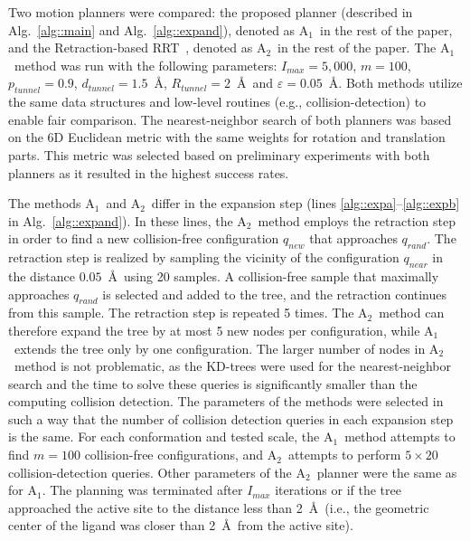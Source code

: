 \documentclass[usletter, 10pt, conference]{ieeeconf} %
\def\qrand{q_{rand}}
\def\qnear{q_{near}}
\def\qnew{q_{new}}
\def\dt{d_{tunnel}}
\def\rv{R_{tunnel}}
\def\Imax{I_{max}} %
\def\gb{p_{tunnel}}
\def\RA{A$_{1}$}
\def\RB{A$_{2}$}
\def\RC{A$_{1}^{*}$}
\begin{document}
Two motion planners were compared: the proposed planner (described in Alg.~\ref{alg::main} and Alg.~\ref{alg::expand}), denoted as \RA\ in the rest of the paper, and the Retraction-based RRT~\cite{zhangRetraction}, denoted as \RB\ in the rest of the paper.
The \RA\ method was run with the following parameters:
$\Imax=5,000$, $m=100$, $\gb=0.9$, $\dt=1.5$~\AA, $\rv=2$~\AA\ and $\varepsilon=0.05$~\AA.
Both methods utilize the same data structures and low-level routines (e.g., collision-detection) to enable fair comparison.
The nearest-neighbor search of both planners was based on the 6D Euclidean metric with the same weights for rotation and translation parts.
This metric was selected based on preliminary experiments with both planners as it resulted in the highest success rates.

The methods \RA\ and \RB\ differ in the expansion step (lines \ref{alg::expa}--\ref{alg::expb} in Alg.~\ref{alg::expand}).
In these lines, the \RB\ method employs the retraction step in order to find a new collision-free configuration $\qnew$ that approaches $\qrand$.
The retraction step is realized by sampling the vicinity of the configuration $\qnear$ in the distance $0.05$~\AA\ using 20 samples.
A collision-free sample that maximally approaches $\qrand$ is selected and added to the tree, and the retraction continues from this sample.
The retraction step is repeated 5 times.
The \RB\ method can therefore expand the tree by at most 5 new nodes per configuration, while \RA\ extends the tree only by one configuration.
The larger number of nodes in \RB\ method is not problematic, as the KD-trees were used for the nearest-neighbor search and the time to solve these queries is significantly smaller than the computing collision detection.
The parameters of the methods were selected in such a way that the number of collision detection queries in each expansion step is the same.
For each conformation and tested scale, the \RA\ method attempts to find $m=100$ collision-free configurations, and \RB\ attempts to perform $5 \times 20$ collision-detection queries.
Other parameters of the \RB\ planner were the same as for \RA.
The planning was terminated after $\Imax$ iterations or if the tree approached the active site to the distance less than 2~\AA\ (i.e., the 
geometric center of the ligand was closer than 2~\AA\ from the active site).
\end{document}
